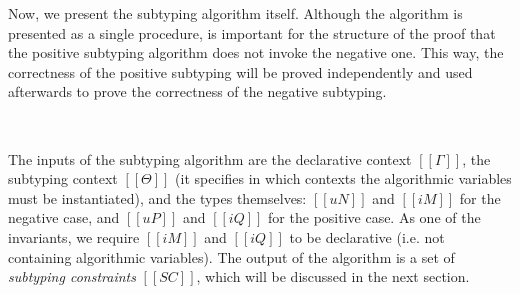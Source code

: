 \documentclass[acmsmall,natbib=false,review,anonymous]{acmart}
\begin{document}
Now, we present the subtyping algorithm itself.
Although the algorithm is presented as a single procedure,
is important for the structure of the proof that the positive subtyping algorithm
does not invoke the negative one. This way, the correctness of the positive 
subtyping will be proved independently and used afterwards to prove the
correctness of the negative subtyping.


\begin{algorithm}[Subtyping]
  \label{alg:subtyping}
  \hfill\\
  \ottdefnANsubLabeled{}
  \ottdefnAPsupLabeled{}
\end{algorithm}

The inputs of the subtyping algorithm are the declarative context $[[Γ]]$,
the subtyping context $[[Θ]]$ (it specifies in which contexts the algorithmic variables
must be instantiated), and the types themselves: $[[uN]]$ and $[[iM]]$ for the negative case,
and $[[uP]]$ and $[[iQ]]$ for the positive case. 
As one of the invariants, we require
$[[iM]]$ and $[[iQ]]$ to be declarative (i.e. not containing algorithmic variables).
The output of the algorithm is a set of \emph{subtyping constraints} $[[SC]]$,
which will be discussed in the next section.
\end{document}
